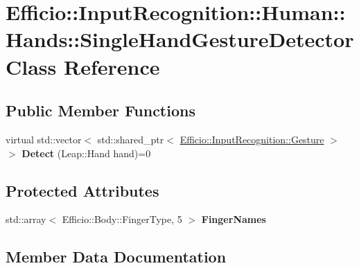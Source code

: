 \hypertarget{class_efficio_1_1_input_recognition_1_1_human_1_1_hands_1_1_single_hand_gesture_detector}{}\section{Efficio\+:\+:Input\+Recognition\+:\+:Human\+:\+:Hands\+:\+:Single\+Hand\+Gesture\+Detector Class Reference}
\label{class_efficio_1_1_input_recognition_1_1_human_1_1_hands_1_1_single_hand_gesture_detector}
\subsection*{Public Member Functions}
\begin{DoxyCompactItemize}
\item 
virtual std\+::vector$<$ std\+::shared\+\_\+ptr$<$ \hyperlink{class_efficio_1_1_input_recognition_1_1_gesture}{Efficio\+::\+Input\+Recognition\+::\+Gesture} $>$ $>$ {\bfseries Detect} (Leap\+::\+Hand hand)=0\hypertarget{class_efficio_1_1_input_recognition_1_1_human_1_1_hands_1_1_single_hand_gesture_detector_a6fb83b598c1f11539f6c49495c987994}{}\label{class_efficio_1_1_input_recognition_1_1_human_1_1_hands_1_1_single_hand_gesture_detector_a6fb83b598c1f11539f6c49495c987994}

\end{DoxyCompactItemize}
\subsection*{Protected Attributes}
\begin{DoxyCompactItemize}
\item 
std\+::array$<$ Efficio\+::\+Body\+::\+Finger\+Type, 5 $>$ {\bfseries Finger\+Names}
\end{DoxyCompactItemize}


\subsection{Member Data Documentation}
